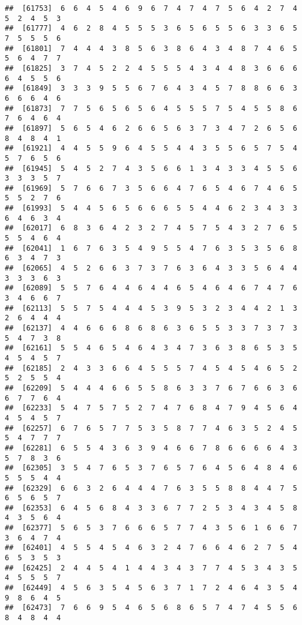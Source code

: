 \documentclass[
]{book}
\begin{document}
\begin{verbatim}
##  [61753]  6  6  4  5  4  6  9  6  7  4  7  4  7  5  6  4  2  7  4  5  2  4  5  3
##  [61777]  4  6  2  8  4  5  5  5  3  6  5  6  5  5  6  3  3  6  5  7  5  5  5  6
##  [61801]  7  4  4  4  3  8  5  6  3  8  6  4  3  4  8  7  4  6  5  5  6  4  7  7
##  [61825]  3  7  4  5  2  2  4  5  5  5  4  3  4  4  8  3  6  6  6  6  4  5  5  6
##  [61849]  3  3  3  9  5  5  6  7  6  4  3  4  5  7  8  8  6  6  3  6  6  6  4  6
##  [61873]  7  7  5  6  5  6  5  6  4  5  5  5  7  5  4  5  5  8  6  7  6  4  6  4
##  [61897]  5  6  5  4  6  2  6  6  5  6  3  7  3  4  7  2  6  5  6  8  4  8  4  1
##  [61921]  4  4  5  5  9  6  4  5  5  4  4  3  5  5  6  5  7  5  4  5  7  6  5  6
##  [61945]  5  4  5  2  7  4  3  5  6  6  1  3  4  3  3  4  5  5  6  3  3  3  5  7
##  [61969]  5  7  6  6  7  3  5  6  6  4  7  6  5  4  6  7  4  6  5  5  5  2  7  6
##  [61993]  5  4  4  5  6  5  6  6  6  5  5  4  4  6  2  3  4  3  3  6  4  6  3  4
##  [62017]  6  8  3  6  4  2  3  2  7  4  5  7  5  4  3  2  7  6  5  5  5  4  6  4
##  [62041]  1  6  7  6  3  5  4  9  5  5  4  7  6  3  5  3  5  6  8  6  3  4  7  3
##  [62065]  4  5  2  6  6  3  7  3  7  6  3  6  4  3  3  5  6  4  4  3  3  3  6  3
##  [62089]  5  5  7  6  4  4  6  4  4  6  5  4  6  4  6  7  4  7  6  3  4  6  6  7
##  [62113]  5  5  7  5  4  4  4  5  3  9  5  3  2  3  4  4  2  1  3  2  6  4  4  4
##  [62137]  4  4  6  6  6  8  6  8  6  3  6  5  5  3  3  7  3  7  3  5  4  7  3  8
##  [62161]  5  5  4  6  5  4  6  4  3  4  7  3  6  3  8  6  5  3  5  4  5  4  5  7
##  [62185]  2  4  3  3  6  6  4  5  5  5  7  4  5  4  5  4  6  5  2  5  2  5  5  4
##  [62209]  5  4  4  4  6  6  5  5  8  6  3  3  7  6  7  6  6  3  6  6  7  7  6  4
##  [62233]  5  4  7  5  7  5  2  7  4  7  6  8  4  7  9  4  5  6  4  4  5  4  5  7
##  [62257]  6  7  6  5  7  7  5  3  5  8  7  7  4  6  3  5  2  4  5  5  4  7  7  7
##  [62281]  6  5  5  4  3  6  3  9  4  6  6  7  8  6  6  6  6  4  3  5  7  8  3  6
##  [62305]  3  5  4  7  6  5  3  7  6  5  7  6  4  5  6  4  8  4  6  5  5  5  4  4
##  [62329]  6  6  3  2  6  4  4  4  7  6  3  5  5  8  8  4  4  7  5  6  5  6  5  7
##  [62353]  6  4  5  6  8  4  3  3  6  7  7  2  5  3  4  3  4  5  8  4  3  5  6  4
##  [62377]  5  6  5  3  7  6  6  6  5  7  7  4  3  5  6  1  6  6  7  3  6  4  7  4
##  [62401]  4  5  5  4  5  4  6  3  2  4  7  6  6  4  6  2  7  5  4  6  5  3  5  3
##  [62425]  2  4  4  5  4  1  4  4  3  4  3  7  7  4  5  3  4  3  5  4  5  5  5  7
##  [62449]  4  5  6  3  5  4  5  6  3  7  1  7  2  4  6  4  3  5  4  9  8  6  4  5
##  [62473]  7  6  6  9  5  4  6  5  6  8  6  5  7  4  7  4  5  5  6  8  4  8  4  4

\end{verbatim}
\end{document}

